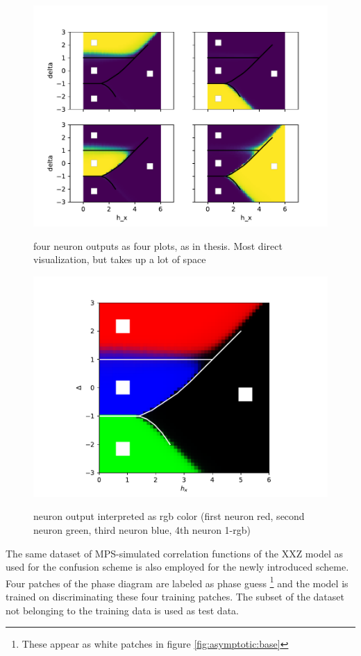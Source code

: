 \documentclass[prl, reprint, twocolumn]{revtex4-1}
\begin{document}
	\begin{figure}[h]
		\includegraphics[width=\columnwidth]{3_6_Weak4PhaseDetection2D_10_20190109}
		\label{fig:asymptotic:base2}
		\caption{four neuron outputs as four plots, as in thesis. Most direct visualization, but takes up a lot of space}
	\end{figure}
	\begin{figure}[h]
		\includegraphics[width=\columnwidth]{3_6_Weak4PhaseDetection2DRGB_40_20190109}
		\label{fig:asymptotic:base3}
		\caption{neuron output interpreted as rgb color  (first neuron red, second neuron green, third neuron blue, 4th neuron 1-rgb)}
	\end{figure}
	The same dataset of MPS-simulated correlation functions of the XXZ model as used for the confusion scheme is also employed for the newly introduced scheme. Four patches of the phase diagram are labeled as phase guess \footnote{These appear as white patches in figure \ref{fig:asymptotic:base}} and the model is trained on discriminating these four training patches. The subset of the dataset not belonging to the training data is used as test data.
	
\end{document}
